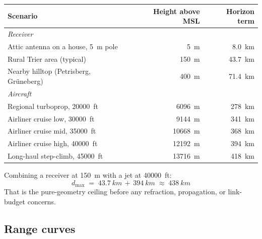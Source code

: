 \documentclass[11pt,a4paper]{article}
\begin{document}
\begin{center}
\begin{tabular}{l r r}
\toprule
Scenario                                      & Height above MSL & Horizon term  \\
\midrule
\multicolumn{3}{l}{\emph{Receiver}} \\
Attic antenna on a house,   \SI{5}{m} pole    & \SI{5}{m}        & \SI{8.0}{km}   \\
Rural Trier area (typical)                    & \SI{150}{m}      & \SI{43.7}{km}  \\
Nearby hilltop (Petrisberg, Grüneberg)        & \SI{400}{m}      & \SI{71.4}{km}  \\
\midrule
\multicolumn{3}{l}{\emph{Aircraft}} \\
Regional turboprop,     \SI{20000}{ft}         & \SI{6096}{m}     & \SI{278}{km}   \\
Airliner cruise low,    \SI{30000}{ft}         & \SI{9144}{m}     & \SI{341}{km}   \\
Airliner cruise mid,    \SI{35000}{ft}         & \SI{10668}{m}    & \SI{368}{km}   \\
Airliner cruise high,   \SI{40000}{ft}         & \SI{12192}{m}    & \SI{394}{km}   \\
Long-haul step-climb,   \SI{45000}{ft}         & \SI{13716}{m}    & \SI{418}{km}   \\
\bottomrule
\end{tabular}
\end{center}

Combining a receiver at \SI{150}{m} with a jet at \SI{40000}{ft}:
\[
d_{\max} \;=\; \SI{43.7}{km} \,+\, \SI{394}{km}
         \;\approx\; \boxed{\SI{438}{km}}
\]
That is the pure-geometry ceiling before any refraction, propagation,
or link-budget concerns.

\subsection{Range curves}
\end{document}
